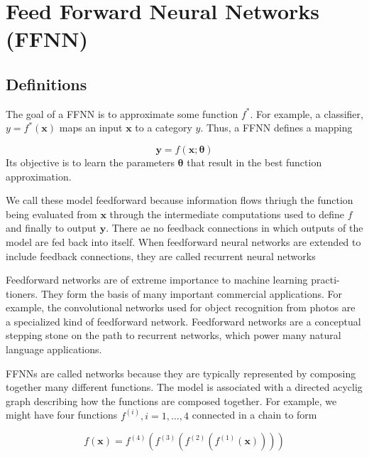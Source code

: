 \section{Feed Forward Neural Networks (FFNN) }
\label{feed_forward_nn}


\subsection{Definitions}

The goal of a FFNN is to approximate some function $f^{*}$. For example,
a classifier, $y = f^{*}(\mathbf{x})$ maps an input $\mathbf{x}$ to a category $y$.
Thus, a FFNN defines a mapping

\begin{equation}
\mathbf{y} = f(\mathbf{x};\mathbf{\theta})
\end{equation}
Its objective is to learn the parameters $\mathbf{\theta}$ that result in the best function approximation.


\begin{framed}
\begin{remark}

We call these model feedforward because information flows thriugh the function being
evaluated from $\mathbf{x}$ through the intermediate computations used to define $f$ and finally to
output $\mathbf{y}$. There ae no feedback connections in which outputs of the model are fed back into itself.
When feedforward neural networks are extended to include feedback connections, they are called recurrent neural networks
\end{remark}
\end{framed}

Feedforward networks are of extreme importance to machine learning practi-
tioners. They form the basis of many important commercial applications. For
example, the convolutional networks used for object recognition from photos are a
specialized kind of feedforward network. Feedforward networks are a conceptual
stepping stone on the path to recurrent networks, which power many natural
language applications.


FFNNs are called networks because they are typically represented by composing together
many different functions. The model is associated with a directed acyclig graph describing
how the functions are composed together.  For example, we might have four functions $f^{(i)}, i=1,\ldots,4$
connected in a chain to form 

\begin{equation}
f(\mathbf{x}) = f^{(4)}(f^{(3)}(f^{(2)}(f^{(1)}(\mathbf{x}))))
\end{equation}

